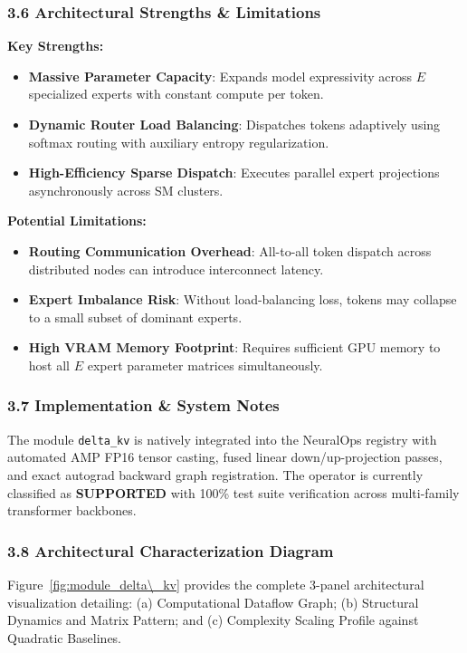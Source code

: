 \subsubsection*{3.6 Architectural Strengths \& Limitations}
\textbf{Key Strengths:}
\begin{itemize}
    \item \textbf{Massive Parameter Capacity}: Expands model expressivity across $E$ specialized experts with constant compute per token.
    \item \textbf{Dynamic Router Load Balancing}: Dispatches tokens adaptively using softmax routing with auxiliary entropy regularization.
    \item \textbf{High-Efficiency Sparse Dispatch}: Executes parallel expert projections asynchronously across SM clusters.
\end{itemize}

\textbf{Potential Limitations:}
\begin{itemize}
    \item \textbf{Routing Communication Overhead}: All-to-all token dispatch across distributed nodes can introduce interconnect latency.
    \item \textbf{Expert Imbalance Risk}: Without load-balancing loss, tokens may collapse to a small subset of dominant experts.
    \item \textbf{High VRAM Memory Footprint}: Requires sufficient GPU memory to host all $E$ expert parameter matrices simultaneously.
\end{itemize}

\subsubsection*{3.7 Implementation \& System Notes}
The module \texttt{delta\_kv} is natively integrated into the NeuralOps registry with automated AMP FP16 tensor casting, fused linear down/up-projection passes, and exact autograd backward graph registration. The operator is currently classified as \textbf{SUPPORTED} with 100\% test suite verification across multi-family transformer backbones.

\subsubsection*{3.8 Architectural Characterization Diagram}
Figure~\ref{fig:module_delta\_kv} provides the complete 3-panel architectural visualization detailing: (a) Computational Dataflow Graph; (b) Structural Dynamics and Matrix Pattern; and (c) Complexity Scaling Profile against Quadratic Baselines.

